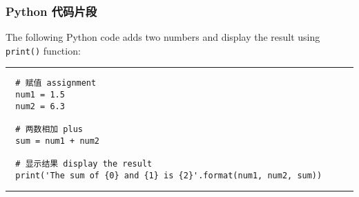 \documentclass{ctexbeamer}
\begin{document}
\begin{frame}[fragile]
\frametitle{Python 代码片段}

The following Python code adds two numbers and display the result using \verb|print()| function:

\rule{\textwidth}{1pt}

\scriptsize
\begin{verbatim}
  # 赋值 assignment
  num1 = 1.5
  num2 = 6.3

  # 两数相加 plus
  sum = num1 + num2

  # 显示结果 display the result
  print('The sum of {0} and {1} is {2}'.format(num1, num2, sum))
\end{verbatim}

\rule{\textwidth}{1pt}

\end{frame}
\end{document}

